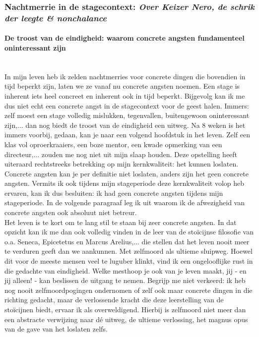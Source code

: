 \documentclass[a4paper,11pt]{article}
\newcommand{\tussen}[1]{\paragraph*{#1}\mbox{}\\}
\theoremstyle{definition}
\begin{document}
\subsubsection{Nachtmerrie in de stagecontext: \emph{Over Keizer Nero, de schrik der leegte \& nonchalance}}
\tussen{De troost van de eindigheid: waarom concrete angsten fundamenteel oninteressant zijn}
In mijn leven heb ik zelden nachtmerries voor concrete dingen die bovendien in 
tijd beperkt zijn, laten we ze vanaf nu concrete angsten noemen. 
Een stage is inherent iets heel concreet en inherent ook in tijd beperkt.
Bijgevolg kan ik me dus niet echt een concrete angst in de stagecontext voor de 
geest halen. Immers: zelf moest een stage volledig mislukken, tegenvallen, 
buitengewoon oninteressant zijn,... dan nog biedt de troost van de eindigheid een 
uitweg. Na 8 weken is het immers voorbij, gedaan, kan je naar een volgend 
hoofdstuk in het leven. Zelf een  klas vol oproerkraaiers, een
boze mentor, een kwade opmerking van een directeur,... zouden me nog niet uit mijn slaap houden.  
Deze opstelling heeft uiteraard rechtstreeks betrekking op mijn kernkwaliteit: 
het kunnen loslaten. Concrete angsten kan je per definitie niet loslaten, anders zijn het geen concrete angsten.
Vermits ik ook tijdens mijn stageperiode deze kernkwaliteit volop heb ervaren, 
kan ik dus besluiten: ik had geen concrete angsten tijdens mijn stageperiode. In 
de volgende paragraaf leg ik uit waarom ik de afwezigheid van concrete angsten 
ook absoluut niet betreur.\\

 
Het leven is te kort om te lang stil te staan bij zeer concrete angsten. In dat opzicht kan ik me dan ook
volledig vinden in de leer van de stoïcijnse filosofie van o.a. Seneca, Epicetetus en Marcus Arelius,... die stellen
dat het leven nooit meer te verduren geeft dan we aankunnen. Met zelfmoord als ultieme sluipweg. Hoewel dit
voor de meeste mensen veel te luguber klinkt, vind ik een ongelooflijke rust in die gedachte van eindigheid. Welke mesthoop je ook
van je leven maakt, jij - en jij alleen! - kan beslissen de uitgang te nemen. Begrijp me niet verkeerd: ik heb
nog nooit zelfmoordpogingen ondernomen of zelf ook maar concrete dingen in die richting gedacht, 
maar de verlossende
kracht die deze leerstelling van de stoïcijnen biedt, ervaar ik als overweldigend. 
Hierbij is zelfmoord niet meer dan een abstracte verwijzing naar dé uitweg, de 
ultieme verlossing, het magnus opus van de gave van het loslaten zelfs.\\
\end{document}

